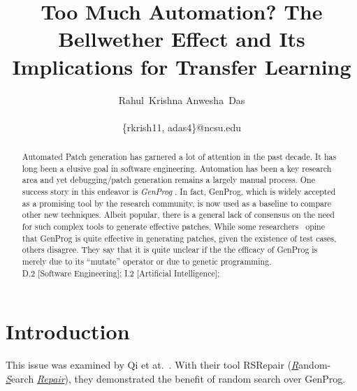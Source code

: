 \documentclass[]{sig-alternate}
\theoremstyle{break}
\begin{document}
     \title{Too Much Automation? The Bellwether Effect and Its Implications for Transfer Learning}
     \author{
     	\alignauthor
     	Rahul~Krishna \hspace{40pt} Anwesha~Das\\
     	\\
     	{\{rkrish11, adas4\}@ncsu.edu}}
     \maketitle

		 \begin{abstract}

			 Automated Patch generation has garnered a lot of attention in the past decade. It has long been a elusive goal in software engineering. Automation has been a key research area and yet debugging/patch generation remains a largely manual process. One success story in this endeavor is \textit{GenProg} . In fact, GenProg, which is widely accepted as a promising tool by the research community, is now used as a baseline to compare other new techniques. Albeit popular, there is a general lack of consensus on the need for such complex tools to generate effective patches. While some researchers~\cite{leGoues12} opine that GenProg is quite effective in generating patches, given the existence of test cases, others \cite{qi2014, kim2013, arcuri2011} disagree. They say that it is quite unclear if the the efficacy of GenProg is merely due to its ``mutate'' operator or due to genetic programming.\\

			  D.2 [Software Engineering]; I.2
        [Artificial Intelligence];

		 \end{abstract}

\section{Introduction}


This issue was examined by Qi et at.~\cite{qi2014}. With their tool RSRepair (\underline{\textit{R}}andom-\underline{\textit{S}}earch \underline{\textit{Repair}}), they demonstrated the benefit of random search over GenProg.
\end{document}
